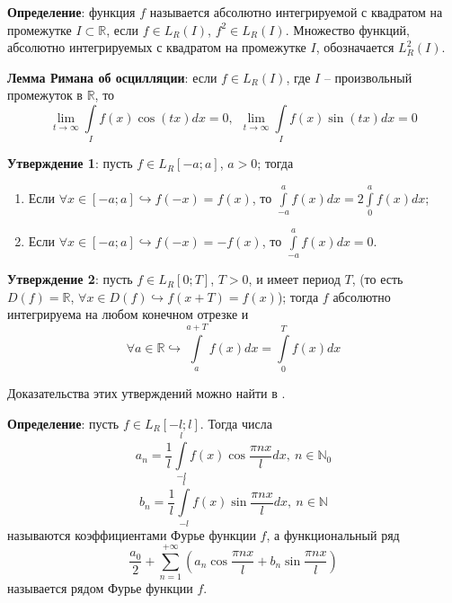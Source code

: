 \documentclass[12pt, a4paper, reqno]{article}
\begin{document}
    \textbf{Определение}: функция $f$ называется абсолютно интегрируемой с квадратом на промежутке
    $I \subset \mathbb{R}$, если $f \in L_R(I)$, $f^2 \in L_R(I)$. Множество функций, абсолютно
    интегрируемых с квадратом на промежутке $I$, обозначается $L^2_R(I)$.

    \textbf{Лемма Римана об осцилляции}: если $f \in L_R(I)$, где $I$ -- произвольный промежуток в
    $\mathbb{R}$, то
    \begin{equation*}
        \lim\limits_{t \to \infty} \int\limits_{I} f(x)\cos{(tx)}dx = 0,\ \
        \lim\limits_{t \to \infty} \int\limits_{I} f(x)\sin{(tx)}dx = 0
    \end{equation*}

    \textbf{Утверждение 1}: пусть $f \in L_R[-a; a]$, $a > 0$; тогда
    \begin{enumerate}
        \item Если $\forall x \in [-a; a] \hookrightarrow f(-x) = f(x)$, то
              $\int\limits_{-a}^{a} f(x)dx = 2 \int\limits_{0}^{a} f(x)dx$;
        \item Если $\forall x \in [-a; a] \hookrightarrow f(-x) = -f(x)$, то
              $\int\limits_{-a}^{a} f(x)dx = 0$.
    \end{enumerate}

    \textbf{Утверждение 2}: пусть $f \in L_R[0; T]$, $T > 0$, и имеет период $T$, (то есть
    $D(f) = \mathbb{R}$, $\forall x \in D(f) \hookrightarrow f(x + T) = f(x)$); тогда $f$ абсолютно
    интегрируема на любом конечном отрезке и
    \begin{equation*}
        \forall a \in \mathbb{R} \hookrightarrow \int\limits_{a}^{a + T} f(x)dx = \int\limits_{0}^{T} f(x)dx
    \end{equation*}

    Доказательства этих утверждений можно найти в \cite{petrovich-3}.

    \textbf{Определение}: пусть $f \in L_R[-l; l]$. Тогда числа
    \begin{equation*}
        a_n = \frac{1}{l}\int\limits_{-l}^{l} f(x)\cos{\frac{\pi n x}{l}}dx,\ n \in \mathbb{N}_0
    \end{equation*}
    \begin{equation*}
        b_n = \frac{1}{l}\int\limits_{-l}^{l} f(x)\sin{\frac{\pi n x}{l}}dx,\ n \in \mathbb{N}
    \end{equation*}
    называются коэффициентами Фурье функции $f$, а функциональный ряд
    \begin{equation*}
        \frac{a_0}{2} + \sum\limits_{n = 1}^{+\infty} \left(a_n \cos{\frac{\pi nx}{l}} +
                                                            b_n \sin{\frac{\pi nx}{l}}\right)
    \end{equation*}
    называется рядом Фурье функции $f$.
\end{document}
